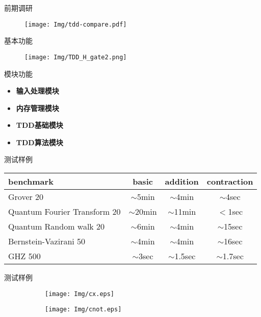 \documentclass[aspectratio=1610]{beamer}
\begin{document}
\begin{frame}{前期调研}
    \begin{figure}
        \centering
        \texttt{[image: Img/tdd-compare.pdf]}
    \end{figure}
\end{frame}
\begin{frame}{基本功能}
    \begin{figure}
        \centering
        \texttt{[image: Img/TDD\_H\_gate2.png]}
    \end{figure}
\end{frame}
\begin{frame}{模块功能}
    \begin{center}
        \begin{itemize}
            \item \textbf{输入处理模块}
            \item \textbf{内存管理模块}
            \item \textbf{TDD基础模块}
            \item \textbf{TDD算法模块}
        \end{itemize}
    \end{center}
\end{frame}
\begin{frame}{测试样例}
    \begin{table}[]
        \Large
        \rule{0pt}{30pt}
        \begin{tabular}{l|ccc}
        benchmark & basic & addition& contraction \\\hline
        Grover 20       & $\sim$5min  & $\sim$4min & $\sim$4sec  \\
        Quantum Fourier Transform 20           & $\sim$20min & $\sim$11min & $<$1sec \\
        Quantum Random walk 20           & $\sim$6min & $\sim$4min & $\sim$15sec\\
        Bernstein-Vazirani 50           & $\sim$4min & $\sim$4min & $\sim$16sec \\
        GHZ 500         & $\sim$3sec & $\sim$1.5sec & $\sim$1.7sec\\
        \end{tabular}
    \end{table}
\end{frame}
\begin{frame}{测试样例}
    \begin{figure}
        \centering
        \begin{subfigure}{0.4\textwidth}
            \centering
            \texttt{[image: Img/cx.eps]}
        \end{subfigure}
        \begin{subfigure}{0.4\textwidth}
            \centering
            \texttt{[image: Img/cnot.eps]}
        \end{subfigure}
    \end{figure}
\end{frame}
\end{document}

